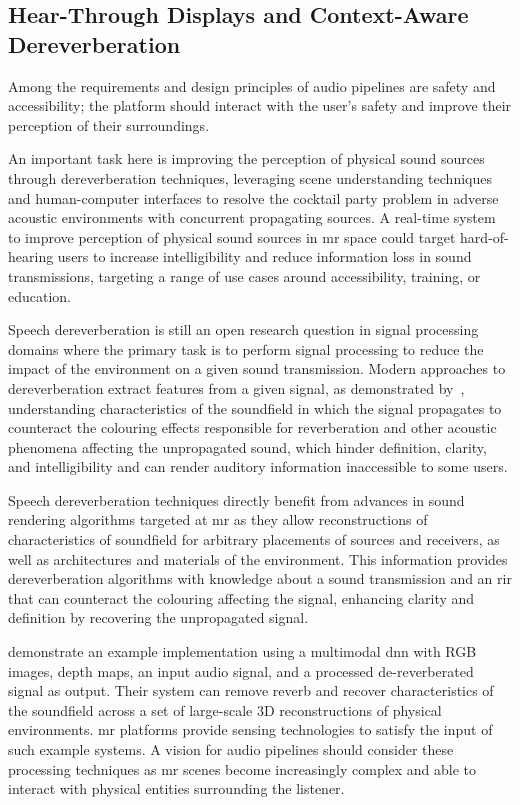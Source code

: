 \subsection{Hear-Through Displays and Context-Aware Dereverberation}
Among the requirements and design principles of audio pipelines are safety and accessibility; the platform should interact with the user's safety and improve their perception of their surroundings. \par
An important task here is improving the perception of physical sound sources through dereverberation techniques, leveraging scene understanding techniques and human-computer interfaces to resolve the cocktail party problem in adverse acoustic environments with concurrent propagating sources. A real-time system to improve perception of physical sound sources in \acrshort{mr} space could target hard-of-hearing users to increase intelligibility and reduce information loss in sound transmissions, targeting a range of use cases around accessibility, training, or education. \par
Speech dereverberation is still an open research question in signal processing domains where the primary task is to perform signal processing to reduce the impact of the environment on a given sound transmission. Modern approaches to dereverberation extract features from a given signal, as demonstrated by~\cite{santos2018speech}, understanding characteristics of the soundfield in which the signal propagates to counteract the colouring effects responsible for reverberation and other acoustic phenomena affecting the unpropagated sound, which hinder definition, clarity, and intelligibility and can render auditory information inaccessible to some users.\par
Speech dereverberation techniques directly benefit from advances in sound rendering algorithms targeted at \acrshort{mr} as they allow reconstructions of characteristics of soundfield for arbitrary placements of sources and receivers, as well as architectures and materials of the environment. This information provides dereverberation algorithms with knowledge about a sound transmission and an \acrshort{rir} that can counteract the colouring affecting the signal, enhancing clarity and definition by recovering the unpropagated signal.\par
\cite{chen2023learning} demonstrate an example implementation using a multimodal \acrshort{dnn} with RGB images, depth maps, an input audio signal, and a processed de-reverberated signal as output. Their system can remove reverb and recover characteristics of the soundfield across a set of large-scale 3D reconstructions of physical environments. \acrshort{mr} platforms provide sensing technologies to satisfy the input of such example systems. A vision for audio pipelines should consider these processing techniques as \acrshort{mr} scenes become increasingly complex and able to interact with physical entities surrounding the listener.\par
